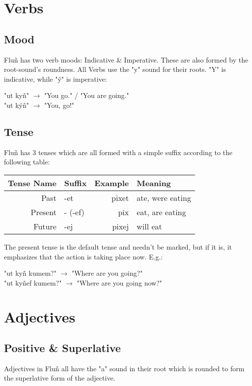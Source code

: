 \documentclass{book}
\newcommand{\ö}{\textscoelig}
\begin{document}
\section{Verbs}
\subsection{Mood}
Fluñ has two verb moods: Indicative \& Imperative. These are also formed by the root-sound's roundness.
All Verbs use the "y" sound for their roots. "Y" is indicative, while "ý" is imperative:

\begin{center}
    "ut kyñ" $\rightarrow$ "You go." / "You are going." \\
    "ut kýñ" $\rightarrow$ "You, go!"
\end{center}

\subsection{Tense}
Fluñ has 3 tenses which are all formed with a simple suffix according to the following table:

\begin{center}
    \begin{tabular}{|r|l|r|l|}
        \hline
        Tense Name  & Suffix    & Example   & Meaning \\
        \hline
        Past        & -et       & pixet     & ate, were eating \\
        Present     & - (-ef)   & pix       & eat, are eating \\
        Future      & -ej       & pixej     & will eat \\
        \hline
    \end{tabular}
\end{center}
The present tense is the default tense and needn't be marked, but if it is, it emphasizes that
the action is taking place now. E.g.:

\begin{center}
    "ut kyñ kumem?" $\rightarrow$ "Where are you going?" \\
    "ut kyñef kumem?" $\rightarrow$ "Where are you going now?"
\end{center}


\section{Adjectives}
\subsection{Positive \& Superlative}
Adjectives in Fluñ all have the "a" sound in their root which is rounded to form the superlative
form of the adjective.
\end{document}
